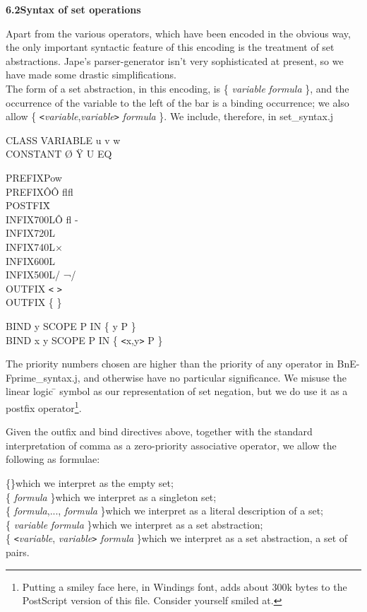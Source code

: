 \textbf{6.2\tab Syntax of set operations}


Apart from the various operators, which have been encoded in the obvious way, the only important syntactic feature of this encoding is the treatment of set abstractions. Jape's parser-generator isn't very sophisticated at present, so we have made some drastic simplifications.\\
The form of a set abstraction, in this encoding, is \{ \textit{variable} {\textbar} \textit{formula} \}, and the occurrence of the variable to the left of the bar is a binding occurrence; we also allow \{ \texttt{<}\textit{variable},\textit{variable}\texttt{>} {\textbar} \textit{formula} \}. We include, therefore, in set\_syntax.j

CLASS VARIABLE u v w\\
CONSTANT {\O} \"{Y} U EQ

PREFIX\tab Pow\\
PREFIX\tab \^{O}\^{O} flfl\\
POSTFIX\tab \={}\\
INFIX\tab 700L\tab \^{O} fl -\\
INFIX\tab 720L\tab {\textbullet}\\
INFIX\tab 740L\tab $\times$\\
INFIX\tab 600L\tab {\ss}\\
INFIX\tab 500L\tab / ¬/\\
OUTFIX \texttt{<} \texttt{>}\\
OUTFIX \{ {\textbar} \}

BIND y SCOPE P IN \{ y {\textbar} P \}\\
BIND x y SCOPE P IN \{ \texttt{<}x,y\texttt{>} {\textbar} P \}


The priority numbers chosen are higher than the priority of any operator in BnE-Fprime\_syntax.j, and otherwise have no particular significance. We misuse the linear logic \={} symbol as our representation of set negation, but we do use it as a postfix operator\footnote{Putting a smiley face here, in Windings font, adds about 300k bytes to the PostScript version of this file. Consider yourself smiled at.}.


Given the outfix and bind directives above, together with the standard interpretation of comma as a zero-priority associative operator, we allow the following as formulae:

\{\}\tab which we interpret as the empty set;\\
\{ \textit{formula} \}\tab which we interpret as a singleton set;\\
\{ \textit{formula},..., \textit{formula} \}\tab which we interpret as a literal description of a set;\\
\{ \textit{variable} {\textbar} \textit{formula} \}\tab which we interpret as a set abstraction;\\
\{ \texttt{<}\textit{variable}, \textit{variable}\texttt{>} {\textbar} \textit{formula} \}\tab which we interpret as a set abstraction, a set of pairs.


